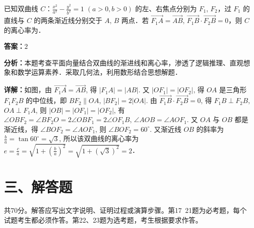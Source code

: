 \begin{question}[points=5]
已知双曲线 $C$：$\frac{x^2}{a^2} - \frac{y^2}{b^2} = 1$ $(a > 0, b > 0)$ 的左、右焦点分别为 $F_1$, $F_2$，过 $F_1$ 的直线与 $C$ 的两条渐近线分别交于 $A$, $B$ 两点．若 $\overrightarrow{F_1A} = \overrightarrow{AB}$, $\overrightarrow{F_1B} \cdot \overrightarrow{F_2B} = 0$，则 $C$ 的离心率为．
\fillin[{$2$}]
\begin{solution}
\textbf{答案：}$2$

\textbf{分析：}本题考查平面向量结合双曲线的渐进线和离心率，渗透了逻辑推理、直观想象和数学运算素养．采取几何法，利用数形结合思想解题．

\textbf{详解：}如图，由 $\overrightarrow{F_1A} = \overrightarrow{AB}$, 得 $|F_1A| = |AB|$. 又 $|OF_1| = |OF_2|$, 得 $OA$ 是三角形 $F_1F_2B$ 的中位线，即 $BF_2 \parallel OA$, $|BF_2| = 2|OA|$. 由 $\overrightarrow{F_1B} \cdot \overrightarrow{F_2B} = 0$, 得 $F_1B \perp F_2B$, $OA \perp F_1A$, 则 $|OB| = |OF_1| = |OF_2|$, 有 $\angle OBF_2 = \angle BF_2O = 2\angle OBF_1 = 2\angle OF_1B$, $\angle AOB = \angle AOF_1$. 又 $OA$ 与 $OB$ 都是渐近线，得 $\angle BOF_2 = \angle AOF_1$, 则 $\angle BOF_2 = 60^\circ$. 又渐近线 $OB$ 的斜率为 $\frac{b}{a} = \tan 60^\circ = \sqrt{3}$, 所以该双曲线的离心率为 $e = \frac{c}{a} = \sqrt{1 + \left(\frac{b}{a}\right)^2} = \sqrt{1 + (\sqrt{3})^2} = 2$．
\end{solution}
\end{question}

\section*{三、解答题}
共70分。解答应写出文字说明、证明过程或演算步骤。第17~21题为必考题，每个试题考生都必须作答。第22、23题为选考题，考生根据要求作答。

